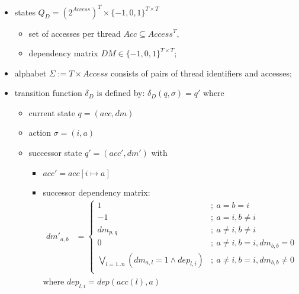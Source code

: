 \documentclass[envcountsame]{llncs}%
\begin{document}
\begin{definition}
\begin{itemize}
  \item states $Q_D= ({2^{Access}})^T \times \{-1,0,1\}^{T\times T}$
  \begin{itemize}
    \item set of accesses per thread $Acc \subseteq Access^T$,
    \item dependency matrix $DM \in \{-1,0,1\}^{T\times T}$;
  \end{itemize}
  \item alphabet $\Sigma:= T\times Access$ consists of pairs
  of thread identifiers and accesses;
  \item transition function $\delta_D$ is defined by:
  $\delta_D(q, \sigma) = q'$ where
  \begin{itemize}
    \item current state $q=(acc, dm)$
    \item action $\sigma=(i, a)$
    \item successor state $q'=(acc', dm')$ with
    \begin{itemize}
      \item $acc'=acc[i\mapsto a]$ 
      \item successor dependency matrix:
      \begin{align*}
       {dm'}_{a,b} & =
       \begin{cases}
       1                                                        & ;\  a=b=i\\
       -1                                                       & ;\ a=i, b\neq i\\
       dm_{p,q}                                                 & ;\ a\neq i, b\neq i \\
       0                                                        & ;\ a\neq i, b=i, dm_{b,b}=0\\
       \bigvee_{l=1..n} \left (dm_{a,l}=1 \wedge dep_{l,i} \right) & ;\ a\neq i, b=i, dm_{b,b}\neq 0\\
       \end{cases}
      \end{align*}
      where $dep_{l,i}= dep(acc(l), a)$
    \end{itemize}
  \end{itemize}
\end{itemize}
\end{definition}


\end{document}
